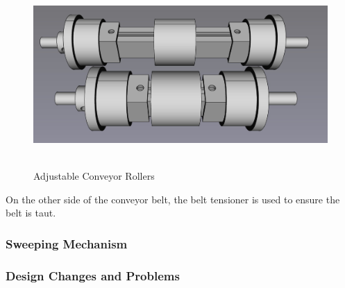\begin{figure}[H]
    \begin{minipage}[h]{0.95\textwidth}
        \centering
        \includegraphics[height=7cm]{imgs/freecad/adjustablerollers.jpg}
        \caption{Adjustable Conveyor Rollers}
        \label{fig:adjustablerollers}
    \end{minipage}
\end{figure}

On the other side of the conveyor belt, the belt tensioner is used to ensure the belt is taut. 

\subsubsection{Sweeping Mechanism}

\subsubsection{Design Changes and Problems}